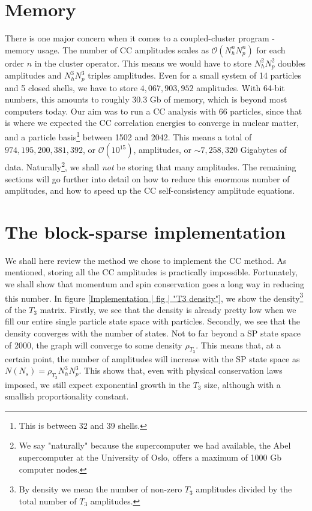 \documentclass[10pt,twoside]{report}
\begin{document}
	\section{Memory}
	There is one major concern when it comes to a coupled-cluster program - memory usage. The number of CC amplitudes scales as $\mathcal{O}(N_h^nN_p^n)$ for each order $n$ in the cluster operator. This means we would have to store $N_h^2N_p^2$ doubles amplitudes and $N_h^3N_p^3$ triples amplitudes. Even for a small system of 14 particles and 5 closed shells, we have to store $4,067,903,952$ amplitudes. With 64-bit numbers, this amounts to roughly 30.3 Gb of memory, which is beyond most computers today. Our aim was to run a CC analysis with 66 particles, since that is where we expected the CC correlation energies to converge in nuclear matter, and a particle basis\footnote{This is between 32 and 39 shells.} between 1502 and 2042. This means a total of $974,195,200,381,392$, or $\mathcal{O}(10^{15})$, amplitudes, or $\sim7,258,320$ Gigabytes of data. Naturally\footnote{We say "naturally" because the supercomputer we had available, the Abel supercomputer at the University of Oslo, offers a maximum of 1000 Gb computer nodes.}, we shall \emph{not} be storing that many amplitudes. The remaining sections will go further into detail on how to reduce this enormous number of amplitudes, and how to speed up the CC self-consistency amplitude equations.
	
	\section{The block-sparse implementation}
	We shall here review the method we chose to implement the CC method. As mentioned, storing all the CC amplitudes is practically impossible. Fortunately, we shall show that momentum and spin conservation goes a long way in reducing this number. In figure \ref{Implementation | fig | "T3 density"}, we show the density\footnote{By density we mean the number of non-zero $T_3$ amplitudes divided by the total number of $T_3$ amplitudes.} of the $T_3$ matrix. Firstly, we see that the density is already pretty low when we fill our entire single particle state space with particles. Secondly, we see that the density converges with the number of states. Not to far beyond a SP state space of 2000, the graph will converge to some density $\rho_{T_3}$. This means that, at a certain point, the number of amplitudes will increase with the SP state space as $N(N_s) = \rho_{T_3}N_h^3N_p^3$. This shows that, even with physical conservation laws imposed, we still expect exponential growth in the $T_3$ size, although with a smallish proportionality constant.\\
	
\end{document}
